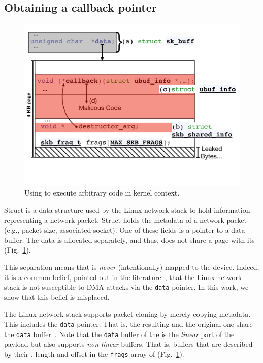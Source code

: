 \subsection{Obtaining a callback pointer}\label{sec:shinfo_exploit}
\begin{figure}[t]
    \centering
    \includegraphics[width=0.8\linewidth]{figs/ubuf.pdf}
    \caption{Using \shinfo{} to execute arbitrary code in kernel context.}
    \label{fig:sh_info}
\end{figure}

Struct \skb{} is a data structure used by the Linux network stack to hold information representing a network packet. Struct \skb{} holds the metadata of a network packet (e.g., packet size, associated socket). One of these fields is a pointer to a data buffer. The data is allocated separately, and thus, does not share a page with its \skb{} (Fig.~\ref{fig:sh_info}). 

This separation means that \skb{} is \emph{never} (intentionally) mapped to the device. Indeed, it is a common belief, pointed out in the literature~\cite{thunder}, that the Linux network stack is not susceptible to DMA attacks via the \texttt{data} pointer. In this work, we show that this belief is misplaced.

The Linux network stack supports packet cloning by merely copying \skb{} metadata. This includes the \texttt{data} pointer. That is, the resulting \skb{} and the original one share the \texttt{data} buffer~\cite{drivers2005linux}. Note that the \texttt{data} buffer of the \skb{} is the \emph{linear} part of the payload but \skb{} also supports \emph{non-linear} buffers. That is, buffers that are described by their \page{}, length and offset in the \texttt{frags} array of \shinfo{} (Fig.~\ref{fig:sh_info}). 

